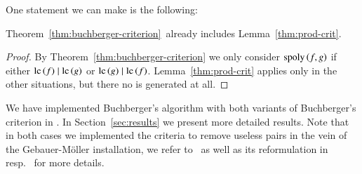 One statement we can make is the following:

\begin{proposition}
Theorem~\ref{thm:buchberger-criterion}\, already includes
Lemma~\ref{thm:prod-crit}.
\label{prop:prod-crit-useless}
\end{proposition}

\begin{proof}
By Theorem~\ref{thm:buchberger-criterion} we only consider $\mathrm{spoly}\left({f},{g}\right)$ if either
$\mathrm{lc}\left({f}\right) \mid \mathrm{lc}\left({g}\right)$ or $\mathrm{lc}\left({g}\right) \mid \mathrm{lc}\left({f}\right)$. Lemma~\ref{thm:prod-crit} applies only
in the other situations, but there no \spt is generated at all.
\end{proof}

We have implemented Buchberger's algorithm with both variants of Buchberger's
criterion in \singular. In Section~\ref{sec:results} we present more detailed
results. Note that in both cases we implemented the criteria to remove useless
pairs in the vein of the Gebauer-M\"oller installation,
we refer to~\cite{gmInstallation1988} as well as
its reformulation in~\cite{mora_2005} resp.~\cite{CERIA2019} for more
details.
